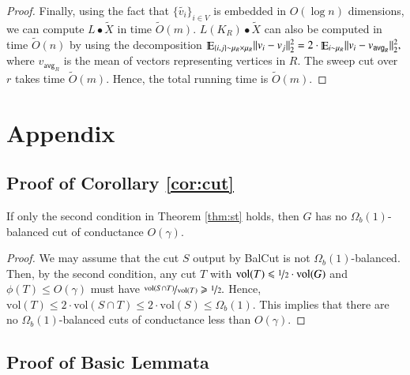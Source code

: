 \documentclass[twoside,leqno,twocolumn]{article}
\newcommand{\nfrac}{\nicefrac}
\renewcommand{\mathbb}{\varmathbb}
\renewcommand{\leq}{\leqslant}
\renewcommand{\geq}{\geqslant}
\newcommand{\norm}[1]{\lVert#1\rVert}
\newcommand{\vol}{\mathrm{vol}}
\newcommand{\Esymb}{\mathbb{E}}
\DeclareMathOperator*{\E}{\Esymb}
\newcommand{\Vol}[1]{\text{vol}(#1)}
\numberwithin{equation}{section}
\newcommand{\alg}{{\sc BalCut}\xspace}
\newcommand{\avg}{{\ensuremath{\mathsf{avg}}\xspace}}
\begin{document}
\begin{proof}
\noindent
Finally,  using the fact that $\{\tilde{v_i}\}_{i \in V}$ is embedded in $O(\log n)$ dimensions, we can compute $L \bullet \tilde{X}$ in time $\tilde{O}(m).$ $L(K_R) \bullet \tilde{X}$ can also be computed in time $\tilde{O}(n)$ by using the decomposition  $\E_{\{i,j\} \sim \mu_R \times \mu_R }\norm{v_i - v_j}_2^2 = 2 \cdot\E_{i \sim \mu_R} \norm{v_i - v_{\avg_R}}^2_2,$ where $v_{\avg_R}$ is the mean of vectors representing vertices in $R.$ 
The sweep cut over $r$ takes time $\tilde{O}(m).$ Hence, the total running time is $\tilde{O}(m).$ 
\end{proof}






\appendix
\section{Appendix}

\subsection{Proof of Corollary \ref{cor:cut}}\label{app:cut}
\begin{lemma}
If only the second condition in Theorem \ref{thm:st} holds, then $G$ has no $\Omega_b(1)$-balanced cut of conductance $O(\gamma).$
\end{lemma}
\begin{proof}
We may assume that the cut $S$ output by \alg is not $\Omega_b(1)$-balanced. Then, by the second condition, any cut $T$ with $\Vol{T} \leq \nfrac{1}{2} \cdot \vol(G)$ and $\phi(T) \leq O(\gamma)$ must have $\nfrac{\Vol{S \cap T}}{\Vol{T}} \geq \nfrac{1}{2}.$
Hence, $\Vol{T} \leq 2 \cdot \Vol{S \cap T} \leq 2 \cdot \Vol{S} \leq \Omega_b(1).$ This implies that there are no $\Omega_b(1)$-balanced cuts of conductance less than $O(\gamma).$
\end{proof}

\subsection{Proof of Basic Lemmata} \label{app:basic}
\end{document}
